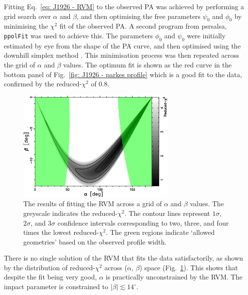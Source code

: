 Fitting Eq.~\eqref{eq: J1926 - RVM} to the observed PA was achieved by performing a grid search over $\alpha$ and $\beta$, and then optimising the free parameters $\psi_0$ and $\phi_0$ by minimising the $\chi^2$ fit of the observed PA. A second program from {\sc psrsalsa}, \texttt{ppolFit} was used to achieve this. The parameters $\phi_0$ and $\psi_0$ were initially estimated by eye from the shape of the PA curve, and then optimised using the downhill simplex method \citep{NumericalRecipes}. This minimisation process was then repeated across the grid of $\alpha$ and $\beta$ values. The optimum fit is shown as the red curve in the bottom panel of Fig.~\ref{fig: J1926 - parkes profile} which is a good fit to the data, confirmed by the reduced-$\chi^2$ of 0.8.
\begin{figure}
    \begin{center}
        \includegraphics[width=0.7\textwidth]{Figures/J1926/banana_plot}
        \caption[The goodness-of-fit of the RVM to the PA curve]{The results of fitting the RVM across a grid of $\alpha$ and $\beta$ values. The greyscale indicates the reduced-$\chi^2$. The contour lines represent $1\sigma$, $2\sigma$, and $3\sigma$ confidence intervals corresponding to two, three, and four times the lowest reduced-$\chi^2$. The green regions indicate `allowed geometries' based on the observed profile width.}
        \label{fig: J1926 - banana plot}
    \end{center}
\end{figure}

There is no single solution of the RVM that fits the data satisfactorily, as shown by the distribution of reduced-$\chi^2$ across ($\alpha$, $\beta$) space (Fig.~\ref{fig: J1926 - banana plot}). This shows that despite the fit being very good, $\alpha$ is practically unconstrained by the RVM. The impact parameter is constrained to $|\beta| \lesssim 14^\circ$.

